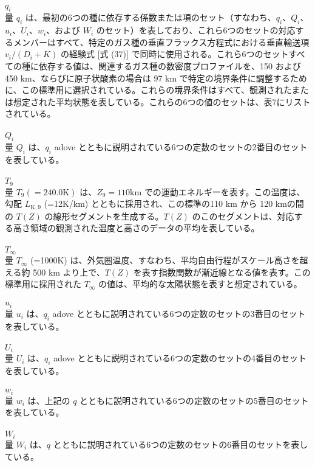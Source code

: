 \documentclass{article}
\begin{document}
\\$q_i$\\
量 $q_i$ は、最初の6つの種に依存する係数または項のセット（すなわち、$q_i$、$Q_i$、$u_i$、$U_i$、$w_i$、および $W_i$ のセット）を表しており、これら6つのセットの対応するメンバーはすべて、特定のガス種の垂直フラックス方程式における垂直輸送項 $v_i/(D_i+K)$ の経験式 [式 (37)] で同時に使用される。これら6つのセットすべての種に依存する値は、関連するガス種の数密度プロファイルを、150 および 450 $\mathrm{km}$、ならびに原子状酸素の場合は 97 $\mathrm{km}$ で特定の境界条件に調整するために、この標準用に選択されている。これらの境界条件はすべて、観測されたまたは想定された平均状態を表している。これらの6つの値のセットは、表7にリストされている。\\
\\$Q_i$\\
量 $Q_i$ は、$q_i$ adove とともに説明されている6つの定数のセットの2番目のセットを表している。\\
\\$T_9$\\
量 $T_9 (=240.0\text{K})$ は、$Z_9 = 110\mathrm{km}$ での運動エネルギーを表す。この温度は、勾配 $L_{\text{K},9}$ (=12K/km) とともに採用され、この標準の110 km から 120 kmの間の $T(Z)$ の線形セグメントを生成する。$T(Z)$ のこのセグメントは、対応する高さ領域の観測された温度と高さのデータの平均を表している。\\
\\$T_\infty$\\
量 $T_\infty$ (=1000K) は、外気圏温度、すなわち、平均自由行程がスケール高さを超える約 500 km より上で、$T(Z)$ を表す指数関数が漸近線となる値を表す。この標準用に採用された $T_\infty$ の値は、平均的な太陽状態を表すと想定されている。\\
\\$u_i$\\
量 $u_i$ は、$q_i$ adove とともに説明されている6つの定数のセットの3番目のセットを表している。\\
\\$U_i$\\
量 $U_i$ は、$q_i$ adove とともに説明されている6つの定数のセットの4番目のセットを表している。\\
\\$w_i$\\
量 $w_i$ は、上記の $q$ とともに説明されている6つの定数のセットの5番目のセットを表している。\\
\\$W_i$\\
量 $W_i$ は、$q$ とともに説明されている6つの定数のセットの6番目のセットを表している。\\
\end{document}
